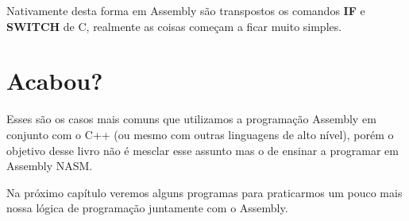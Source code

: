 Nativamente desta forma em Assembly são transpostos os comandos \textbf{IF} e \textbf{SWITCH} de C, realmente as coisas começam a ficar muito simples.

\section{Acabou?}
Esses são os casos mais comuns que utilizamos a programação Assembly em conjunto com o C++ (ou mesmo com outras linguagens de alto nível), porém o objetivo desse livro não é mesclar esse assunto mas o de ensinar a programar em Assembly NASM.

Na próximo capítulo veremos alguns programas para praticarmos um pouco mais nossa lógica de programação juntamente com o Assembly.

\clearpage